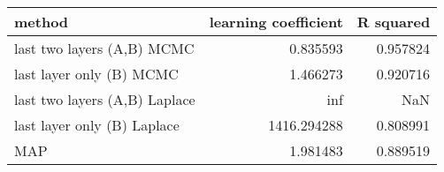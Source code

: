 \begin{tabular}{lrr}
\toprule
                        method &  learning coefficient &  R squared \\
\midrule
    last two layers (A,B) MCMC &              0.835593 &   0.957824 \\
      last layer only (B) MCMC &              1.466273 &   0.920716 \\
 last two layers (A,B) Laplace &                   inf &        NaN \\
   last layer only (B) Laplace &           1416.294288 &   0.808991 \\
                           MAP &              1.981483 &   0.889519 \\
\bottomrule
\end{tabular}

